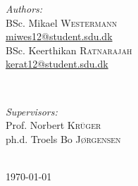 \documentclass[11pt,twoside]{article}
\begin{document}
\begin{titlepage}
\begin{minipage}{0.4\textwidth}
\begin{flushleft} \large
\emph{Authors:}\\
BSc. Mikael \textsc{Westermann}\\
\url{miwes12@student.sdu.dk}\\
BSc. Keerthikan \textsc{Ratnarajah}\\ %
\url{kerat12@student.sdu.dk}
\end{flushleft}
\end{minipage}
~
\begin{minipage}{0.4\textwidth}
\begin{flushright} \large
\emph{Supervisors:} \\
Prof. Norbert \textsc{Krüger}\\ %
ph.d. Troels Bo \textsc{Jørgensen}\\
\end{flushright}
\end{minipage}\\ %


\vfill
{\large \today} %


 


\end{titlepage}
\cleardoublepage
{}

%
\tableofcontents
\newpage
\listoffigures
\listoftables
\cleardoublepage
{}
\pagestyle{fancy}
\fancyfoot{}
\fancyfoot[RO,LE]{\thepage}
\setcounter{page}{1}
%
%
%
%




\cleardoublepage
%

\end{document}
